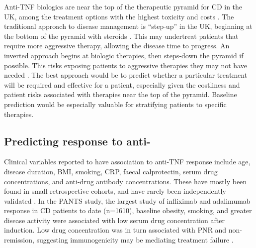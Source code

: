 Anti-\gls{TNF} biologics are near the top of the therapeutic pyramid for \gls{CD} in the UK, among the treatment options with the highest toxicity and costs \autocite{rogler2015WhereAreWe}.
The traditional approach to disease management is \enquote{step-up} in the UK, beginning at the bottom of the pyramid with steroids \autocite{rogler2015WhereAreWe,adegbola2018AntiTNFTherapyCrohn}.
This may undertreat patients that require more aggressive therapy, allowing the disease time to progress.
An inverted approach begins at biologic therapies, then steps-down the pyramid if possible.
This risks exposing patients to aggressive therapies they may not have needed \autocite{flamant2018InflammatoryBowelDisease}.
The best approach would be to predict whether a particular treatment will be required and effective for a patient, especially given the costliness and patient risks associated with therapies near the top of the pyramid.
Baseline prediction would be especially valuable for stratifying patients to specific therapies.

\subsection{Predicting response to anti-}
\label{subsec:multiPANTS_intro_predicting_response}

Clinical variables reported to have association to anti-\gls{TNF} response include age, disease duration, \gls{BMI}, smoking, \gls{CRP}, faecal calprotectin, serum drug concentrations, and anti-drug antibody concentrations.
These have mostly been found in small retrospective cohorts, and have rarely been independently validated \autocite{dhaens2011LondonPositionStatement,ding2016SystematicReviewPredicting,kopylov2016PredictingDurableResponse,flamant2018InflammatoryBowelDisease,digby-bell2019InterrogatingHostImmunity,noor2020PersonalisedMedicineCrohn}.
In the \gls{PANTS} study, the largest study of infliximab and adalimumab response in \gls{CD} patients to date (n=1610),
baseline obesity, smoking, and greater disease activity were associated with low serum drug concentration after induction.
Low drug concentration was in turn associated with \gls{PNR} and non-remission, suggesting immunogenicity may be mediating treatment failure \autocite{kennedy2019PredictorsAntiTNFTreatment}.

